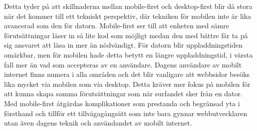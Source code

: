 \documentclass[11pt]{article}
\begin{document}
Detta tyder på att skillnaderna mellan mobile-first och desktop-first blir då stora när det kommer till ett tekniskt perspektiv, där tekniken för mobilen inte är lika avancerad som den för datorn.  Mobile-first ser till att enheten med sämre förutsättningar läser in så lite kod som möjligt medan den med bättre får ta på sig ansvaret att läsa in mer än nödvändigt. För datorn blir uppladdningstiden omärkbar, men för mobilen hade detta betytt en längre uppladdningstid, i värsta fall mer än vad som accepteras av en användare. Dagens användare av mobilt internet finns numera i alla områden och det blir vanligare att webbsidor besöks lika mycket via mobilen som via desktop. Detta kräver mer fokus på mobilen för att kunna skapa samma förutsättningar som när surfandet sker från en dator. Med mobile-first åtgärdas komplikationer som prestanda och begränsad yta i försthand och tillför ett tillvägagångsätt som inte bara gynnar webbutvecklaren utan även dagens teknik och användandet av mobilt internet.




\printbibliography
\end{document}
